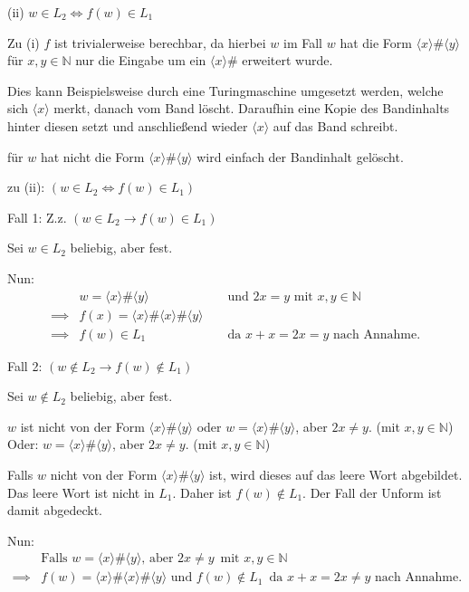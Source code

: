 \documentclass[a4paper,12pt]{article}
\begin{document}
(ii) $w \in L_2 \iff f(w) \in L_1$

\vspace{0.5cm}

Zu (i) $f$ ist trivialerweise berechbar, da hierbei $w$ im Fall
$w$ hat die Form $\langle x\rangle\#\langle y\rangle$ für $x,y\in\mathbb{N}$ nur die Eingabe um ein $\langle x\rangle\#$ erweitert wurde.

Dies kann Beispielsweise durch eine Turingmaschine umgesetzt werden, welche sich $\langle x\rangle$ merkt,
danach vom Band löscht. Daraufhin eine Kopie des Bandinhalts hinter diesen setzt
und anschließend wieder $\langle x\rangle$ auf das Band schreibt.

für $w$ hat nicht die Form $\langle x\rangle\#\langle y\rangle$ wird einfach der Bandinhalt gelöscht.

zu (ii): $(w \in L_2 \iff f(w) \in L_1)$

Fall 1: Z.z. $(w \in L_2 \rightarrow f(w) \in L_1)$

Sei $w\in L_2$ beliebig, aber fest.

Nun:
$$\begin{aligned}
             & w=\langle x\rangle\#\langle y\rangle                        &  & \text{ und } 2x = y \text{ mit } x,y \in \mathbb{N} \\
    \implies & f(x) = \langle x\rangle\#\langle x\rangle\#\langle y\rangle                                                          \\
    \implies & f(w) \in L_1                                                &  & \text{ da } x+x = 2x = y \text{ nach Annahme.}
  \end{aligned}$$

\vspace{1cm}

Fall 2: $(w \notin L_2 \rightarrow f(w) \notin L_1)$

Sei $w \notin L_2$ beliebig, aber fest.

$w$ ist nicht von der Form $\langle x\rangle\#\langle y\rangle$ oder $w=\langle x\rangle\#\langle y\rangle$, aber $2x \neq y$. (mit $x,y \in \mathbb{N}$)
Oder: $w=\langle x\rangle\#\langle y\rangle$, aber $2x \neq y$. (mit $x,y \in \mathbb{N}$)

Falls $w$ nicht von der Form $\langle x\rangle\#\langle y\rangle$ ist, wird dieses auf das leere Wort abgebildet.
Das leere Wort ist nicht in $L_1$. Daher ist $f(w) \notin L_1$. Der Fall der Unform ist damit abgedeckt.

Nun:
$$\begin{aligned}
             & \text{Falls } w=\langle x\rangle\#\langle y\rangle\text{, aber } 2x \neq y\,\text{ mit } x,y \in \mathbb{N}                              \\
    \implies & f(w)=\langle x\rangle\#\langle x\rangle\#\langle y\rangle\text{ und } f(w) \notin L_1\,\text{ da } x+x = 2x \neq y \text{ nach Annahme.} \\
  \end{aligned}$$
\end{document}
